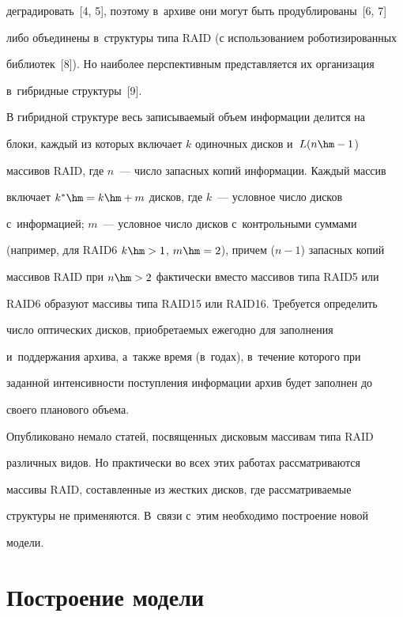 деградировать~[4, 5], поэтому в~архиве они могут быть продублированы~[6, 7] 


либо объединены в~структуры типа RAID (с использованием роботизированных 


библиотек~[8]). Но наиболее перспективным представляется их организация 


в~гибридные структуры~[9].


  


  В гибридной структуре весь записываемый объем информации делится на 


блоки, каждый из которых включает $k$ одиночных дисков и~$L(n\hm-1$) 


массивов RAID, где $n$~--- число запасных копий информации. Каждый массив 


включает $k^*\hm = k \hm+ m$ дисков, где $k$~--- условное число дисков 


с~информацией; $m$~--- условное число дисков с~контрольными суммами 


(например, для RAID6 $k \hm> 1$, $m \hm= 2$), причем ($n-1$) запасных копий 


массивов RAID при $n \hm> 2$ фактически вместо массивов типа RAID5 или 


RAID6 образуют массивы типа RAID15 или RAID16. Требуется определить 


число оптических дисков, приобретаемых ежегодно для заполнения 


и~поддержания архива, а~также время (в~годах), в~течение которого при 


заданной интенсивности поступления информации архив будет заполнен до 


своего планового объема.


  


  Опубликовано немало статей, посвященных дисковым массивам типа RAID 


различных видов. Но практически во всех этих работах рассматриваются 


массивы RAID, составленные из жестких дисков, где рассматриваемые 


структуры не применяются. В~связи с~этим необходимо построение новой 


модели.


  


\section{Построение модели}





